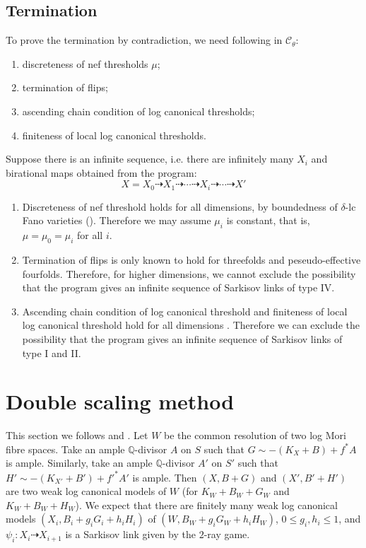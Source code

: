 \documentclass[11pt]{amsart}
\begin{document}
\subsection{Termination}
To prove the termination by contradiction, we need following in $\mathcal{C}_{\theta}$: 
\begin{enumerate}
  \item discreteness of nef thresholds $\mu$;
  \item termination of flips;
  \item ascending chain condition of log canonical thresholds;
  \item finiteness of local log canonical thresholds.
\end{enumerate}
Suppose there is an infinite sequence, i.e. there are infinitely many $ X_i $ and birational maps obtained from the program:
\[ X=X_0\dashrightarrow X_1\dashrightarrow \cdots\dashrightarrow X_i \dashrightarrow\cdots\dashrightarrow X'\]
\begin{enumerate}
  \item Discreteness of nef threshold holds for all dimensions, by boundedness of $\delta$-lc Fano varieties (\cite[Theorem 1.1]{birkarSingularitiesLinearSystems2020}). Therefore we may assume $\mu_{i}$ is constant, that is, $\mu=\mu_{0}=\mu_{i}$ for all $i$.
  \item  Termination of flips is only known  to hold for threefolds and peseudo-effective fourfolds.  
    Therefore, for higher dimensions, we cannot exclude the possibility that the program gives an infinite sequence of Sarkisov links of type IV.
  \item Ascending chain condition of log canonical threshold and finiteness of local log canonical threshold hold for all dimensions \cite{HMX14}. Therefore we can exclude the possibility that the program gives an infinite sequence of Sarkisov links of type I and II.

\end{enumerate}

\section{Double scaling method}
This section we follows \cite[\S 13]{haconMinimalModelProgram2012} and  \cite{liuSarkisovProgramGeneralized2021}.
 Let $W$ be the common resolution of two log Mori fibre spaces. Take an ample $\mathbb{Q}$-divisor $A$ on $S$ such that $G\sim -(K_{X}+B) +f^*A$  is ample. Similarly, take an ample $\mathbb{Q}$-divisor $A'$ on $S'$ such that $H'\sim -(K_{X'}+B') +f'^*A'$  is ample. Then  $(X,B+G)$ and $(X',B'+H')$ are two weak log canonical models of $W$ (for $K_{W}+B_{W}+G_{W}$ and $K_{W}+B_{W}+H_{W}$). We expect that there are finitely many weak log canonical models $(X_{i},B_{i}+g_{i}G_{i}+h_{i}H_{i})$ of $(W,B_{W}+g_{i}G_{W}+h_{i}H_{W})$, $0\leq g_i,h_i\leq 1$, and $\psi_{i}:X_{i}\dashrightarrow X_{i+1}$ is a Sarkisov link given by the $2$-ray game.
\end{document}
